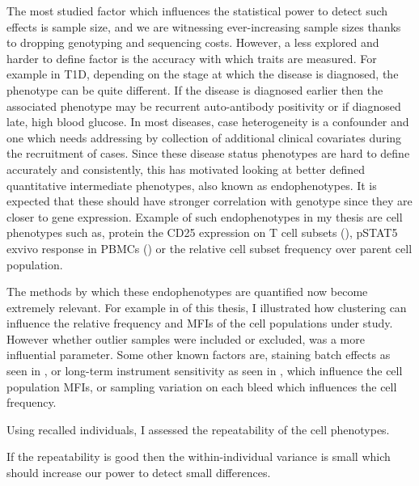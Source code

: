 The most studied factor which influences the statistical power to detect such effects is sample size, and we are witnessing ever-increasing sample sizes thanks to dropping genotyping and sequencing costs.
However, a less explored and harder to define factor is the accuracy with which traits are measured.
For example in \gls{T1D}, depending on the stage at which the disease is diagnosed, the phenotype can be quite different.
If the disease is diagnosed earlier then the associated phenotype may be recurrent auto-antibody positivity or if diagnosed late, high blood glucose.
In most diseases, case heterogeneity is a confounder and one which needs addressing by collection of additional clinical covariates during the recruitment of cases.
Since these disease status phenotypes are hard to define accurately and consistently,
this has motivated looking at better defined quantitative intermediate phenotypes, also known as endophenotypes.
It is expected that these should have stronger correlation with genotype since they are closer to gene expression.
Example of such endophenotypes in my thesis are cell phenotypes such as, protein the CD25 expression on T cell subsets (), pSTAT5 exvivo response in \glspl{PBMC} () or the relative cell subset frequency over parent cell population.

The methods by which these endophenotypes are quantified now become extremely relevant.
For example in  of this thesis, I illustrated how clustering can influence the relative frequency and MFIs of the cell populations under study.
However whether outlier samples were included or excluded, was a more influential parameter.
Some other known factors are, staining batch effects as seen in , or long-term instrument sensitivity as seen in , which influence the cell population \glspl{MFI}, or sampling variation on each bleed which influences the cell frequency.

Using recalled individuals, I assessed the repeatability of the cell phenotypes.

If the repeatability is good then the within-individual variance is small which should increase our power to detect small differences.

